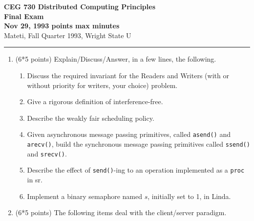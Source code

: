 \def\CSP{{\sc csp}}
\def\SR{{\sc sr}}
\def\RPC{{\sc rpc}}
\def\fat{\framebox[1mm]{\rule{0mm}{2mm}}}
\def\co{{\bf co}}
\def\oc{{\bf oc}}
\def\pa{{$\parallel$}}
\def\lb{$\langle$}
\def\rb{$\rangle$}
\def\ra{$\rightarrow$}
\def\await{{\bf await}}

\parskip=0pt
\parindent=0pt



{\bf CEG 
\large \bf 730 Distributed Computing Principles\\[5pt]
\large Final Exam\\[10pt]
Nov 29, 1993  points max  minutes\\
}
\bigskip
{Mateti,  Fall Quarter 1993, Wright State U}\\[-5pt]
\hrule

\begin{enumerate}

\item (6*5 points)
Explain/Discuss/Answer, in a few lines, the following.

\begin{enumerate}

\item
Discuss the required invariant for the Readers and Writers (with or
without priority for writers, your choice) problem.


\item Give a rigorous definition of interference-free.

\item Describe the weakly fair scheduling policy.

\item
Given asynchronous message passing primitives, called {\tt asend()}
and {\tt arecv()}, build the synchronous message passing primitives
called {\tt ssend()} and {\tt srecv()}.

\item
Describe the effect of {\tt send()}-ing to an operation
implemented as a {\tt proc} in \SR.

\item
Implement a binary semaphore named $s$, initially set to 1, in Linda.

\end{enumerate}


\item (6*5 points)
The following items deal with the  client/server paradigm.  


\begin{enumerate}


\end{enumerate}
\end{enumerate}

